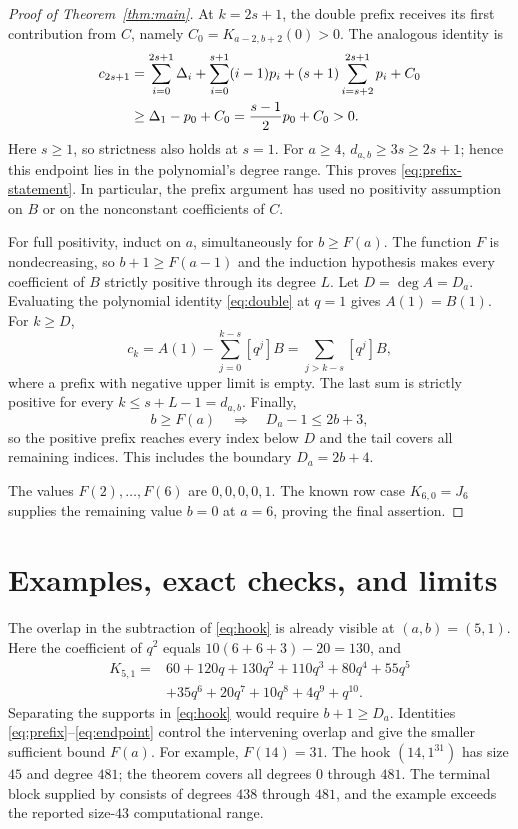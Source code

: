 \documentclass[11pt]{article}
\newcommand{\coeff}[2]{[q^{#1}]#2}
\begin{document}
\begin{proof}[Proof of Theorem~\ref{thm:main}]
At $k=2s+1$, the double prefix receives its first contribution from $C$,
namely $C_0=K_{a-2,b+2}(0)>0$. The analogous identity is
\begin{align}
 c_{2s+1}
 &=\sum_{i=0}^{2s+1}\Delta_i+\sum_{i=0}^{s+1}(i-1)p_i
       +(s+1)\sum_{i=s+2}^{2s+1}p_i+C_0\notag\\
 &\geq\Delta_1-p_0+C_0
   =\frac{s-1}{2}p_0+C_0>0.\label{eq:endpoint}
\end{align}
Here $s\geq1$, so strictness also holds at $s=1$.
For $a\geq4$, $d_{a,b}\geq3s\geq2s+1$; hence this endpoint lies in
the polynomial's degree range. This proves
\eqref{eq:prefix-statement}. In particular, the prefix argument has used
no positivity assumption on $B$ or on the nonconstant coefficients of $C$.

For full positivity, induct on $a$, simultaneously for $b\geq F(a)$.
The function $F$ is nondecreasing, so $b+1\geq F(a-1)$ and the induction
hypothesis makes every coefficient of $B$ strictly positive through its
degree $L$. Let $D=\deg A=D_a$. Evaluating the polynomial identity
\eqref{eq:double} at $q=1$ gives $A(1)=B(1)$. For $k\geq D$,
\begin{equation}\label{eq:tail}
 c_k=A(1)-\sum_{j=0}^{k-s}\coeff{j}{B}
     =\sum_{j>k-s}\coeff{j}{B},
\end{equation}
where a prefix with negative upper limit is empty. The last sum is
strictly positive for every $k\leq s+L-1=d_{a,b}$.
Finally,
\[
 b\geq F(a)\quad\Longrightarrow\quad D_a-1\leq2b+3,
\]
so the positive prefix reaches every index below $D$ and the tail covers
all remaining indices. This includes the boundary $D_a=2b+4$.

The values $F(2),\ldots,F(6)$ are $0,0,0,0,1$.
The known row case $K_{6,0}=J_6$ supplies the remaining value $b=0$ at
$a=6$, proving the final assertion.
\end{proof}

\section{Examples, exact checks, and limits}

The overlap in the subtraction of \eqref{eq:hook} is already visible at
$(a,b)=(5,1)$. Here the coefficient of $q^2$ equals
$10(6+6+3)-20=130$, and
\begin{align*}
 K_{5,1}={}&60+120q+130q^2+110q^3+80q^4+55q^5\\
          &+35q^6+20q^7+10q^8+4q^9+q^{10}.
\end{align*}
Separating the supports in \eqref{eq:hook} would require
$b+1\geq D_a$. Identities \eqref{eq:prefix}--\eqref{eq:endpoint} control
the intervening overlap and give the smaller sufficient bound $F(a)$.
For example, $F(14)=31$. The hook $(14,1^{31})$ has size $45$ and degree
$481$; the theorem covers all degrees $0$ through $481$. The terminal
block supplied by \cite[Corollary~5.2]{BrugidouMonomial} consists of
degrees $438$ through $481$, and the example exceeds the reported
size-$43$ computational range.
\end{document}
